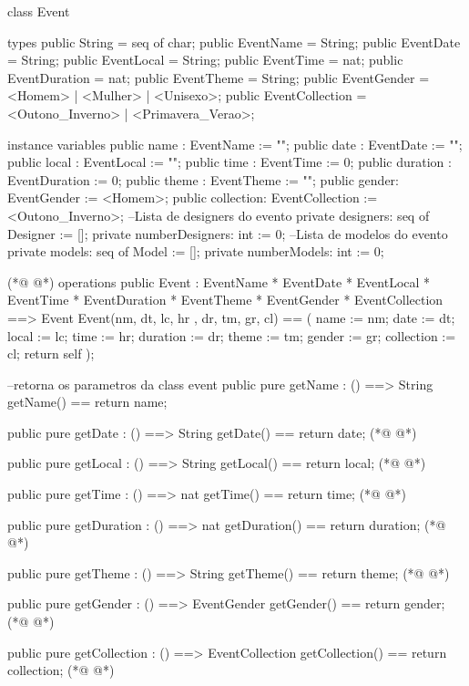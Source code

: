 \begin{vdmpp}[breaklines=true]
class Event
 
types
 public String = seq of char; 
 public EventName = String;
 public EventDate = String;
 public EventLocal = String;
 public EventTime = nat;
 public EventDuration = nat;
 public EventTheme = String;
 public EventGender = <Homem> | <Mulher> | <Unisexo>;
  public EventCollection = <Outono_Inverno> | <Primavera_Verao>;

instance variables
 public  name : EventName := "";
 public  date : EventDate := "";
 public  local : EventLocal := "";
 public  time : EventTime := 0;
 public  duration : EventDuration := 0;
 public  theme : EventTheme := "";
 public  gender: EventGender := <Homem>;
 public  collection: EventCollection := <Outono_Inverno>;
 --Lista de designers do evento
 private  designers: seq of Designer := [];
 private  numberDesigners: int := 0;
 --Lista de modelos do evento
 private  models: seq of Model := [];
 private  numberModels: int := 0;
 
(*@
\label{Event:30}
@*)
operations
 public Event : 
         EventName * 
         EventDate *
         EventLocal *
         EventTime *
         EventDuration *
         EventTheme *
         EventGender *  
         EventCollection ==> Event
 Event(nm, dt, lc, hr , dr, tm, gr, cl) == (
  name := nm;
  date := dt;
  local := lc;
  time := hr;
  duration := dr;
  theme := tm;
  gender := gr;
  collection := cl;
  return self
 );
 
 --retorna os parametros da class event
  public pure getName : () ==> String
    getName() == return name;
    
   public pure getDate : () ==> String
     getDate() == return date;
(*@
\label{getName:58}
@*)
     
  public pure getLocal : () ==> String
     getLocal() == return local;
(*@
\label{getDate:61}
@*)
     
  public pure getTime : () ==> nat
     getTime() == return time;      
(*@
\label{getLocal:64}
@*)
     
  public pure getDuration : () ==> nat
     getDuration() == return duration;
(*@
\label{getTime:67}
@*)
     
  public pure getTheme : () ==> String
     getTheme() == return theme;
(*@
\label{getDuration:70}
@*)
     
  public pure getGender : () ==> EventGender
     getGender() == return gender;
(*@
\label{getTheme:73}
@*)
     
  public pure getCollection : () ==> EventCollection
     getCollection() == return collection;
(*@
\label{getGender:76}
@*)
  

\end{vdmpp}
